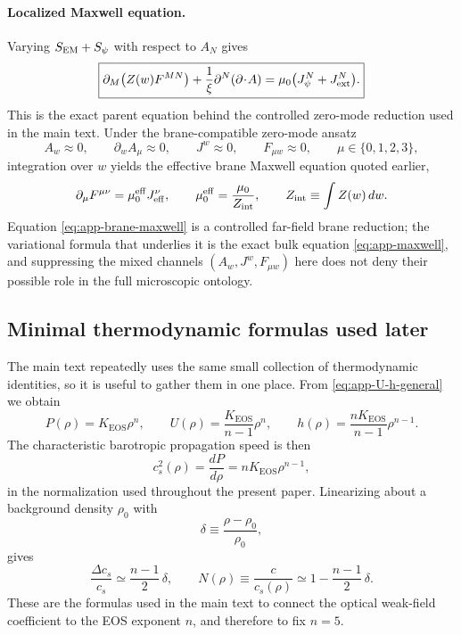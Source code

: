 \documentclass[11pt]{article}
\newcommand{\Zloc}{Z}
\newcommand{\KEOS}{K_{\mathrm{EOS}}}
\begin{document}
\paragraph{Localized Maxwell equation.}
Varying \(S_{\rm EM}+S_\psi\) with respect to \(A_N\) gives
\begin{equation}
\boxed{
\partial_M\!\left(\Zloc(w)F^{MN}\right)
+
\frac{1}{\xi}\partial^N(\partial\!\cdot\!A)
=
\mu_0\bigl(J_\psi^N+J_{\rm ext}^N\bigr).
}
\label{eq:app-maxwell}
\end{equation}
This is the exact parent equation behind the controlled zero-mode reduction used in the
main text. Under the brane-compatible zero-mode ansatz
\begin{equation}
A_w\approx0,
\qquad
\partial_w A_\mu \approx 0,
\qquad
J^w \approx 0,
\qquad
F_{\mu w} \approx 0,
\qquad
\mu\in\{0,1,2,3\},
\label{eq:app-zero-mode}
\end{equation}
integration over \(w\) yields the effective brane Maxwell equation quoted earlier,
\begin{equation}
\partial_\mu F^{\mu\nu}
=
\mu_0^{\rm eff}J_{\rm eff}^\nu,
\qquad
\mu_0^{\rm eff}
=
\frac{\mu_0}{Z_{\rm int}},
\qquad
Z_{\rm int}\equiv \int \Zloc(w)\,dw.
\label{eq:app-brane-maxwell}
\end{equation}
Equation \eqref{eq:app-brane-maxwell} is a controlled far-field brane reduction; the
variational formula that underlies it is the exact bulk equation \eqref{eq:app-maxwell},
and suppressing the mixed channels \((A_w,J^w,F_{\mu w})\) here does not deny their
possible role in the full microscopic ontology.

\subsection{Minimal thermodynamic formulas used later}
\label{app:variational-thermo}

The main text repeatedly uses the same small collection of thermodynamic identities, so it
is useful to gather them in one place. From \eqref{eq:app-U-h-general} we obtain
\begin{equation}
P(\rho)=\KEOS \rho^n,
\qquad
U(\rho)=\frac{\KEOS}{n-1}\rho^n,
\qquad
h(\rho)=\frac{n\KEOS}{n-1}\rho^{n-1}.
\label{eq:app-thermo-triple}
\end{equation}
The characteristic barotropic propagation speed is then
\begin{equation}
c_s^2(\rho)=\frac{dP}{d\rho}=n\KEOS \rho^{n-1},
\label{eq:app-cs2}
\end{equation}
in the normalization used throughout the present paper. Linearizing about a background
density \(\rho_0\) with
\begin{equation}
\delta \equiv \frac{\rho-\rho_0}{\rho_0},
\label{eq:app-delta}
\end{equation}
gives
\begin{equation}
\frac{\Delta c_s}{c_s}
\simeq
\frac{n-1}{2}\,\delta,
\qquad
N(\rho)\equiv \frac{c}{c_s(\rho)}
\simeq
1-\frac{n-1}{2}\,\delta.
\label{eq:app-linearized-index}
\end{equation}
These are the formulas used in the main text to connect the optical weak-field coefficient
to the EOS exponent \(n\), and therefore to fix \(n=5\).
\end{document}
